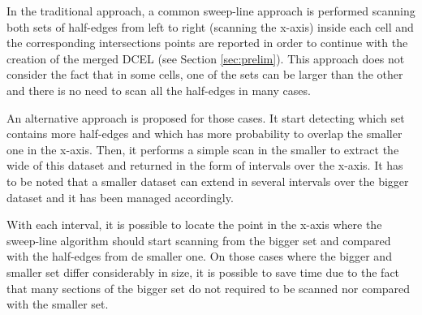 In the traditional approach, a common sweep-line approach is performed scanning both sets of half-edges from left to right (scanning the x-axis) inside each cell and the corresponding intersections points are reported in order to continue with the creation of the merged DCEL (see Section \ref{sec:prelim}). This approach does not consider the fact that in some cells, one of the sets can be larger than the other and there is no need to scan all the half-edges in many cases.

An alternative approach is proposed for those cases.  It start detecting which set contains more half-edges and which has more probability to overlap the smaller one in the x-axis. Then, it performs a simple scan in the smaller to extract the wide of this dataset and returned in the form of intervals over the x-axis.  It has to be noted that a smaller dataset can extend in several intervals over the bigger dataset and it has been managed accordingly.  

With each interval, it is possible to locate the point in the x-axis where the sweep-line algorithm should start scanning from the bigger set and compared with the half-edges from de smaller one. On those cases where the bigger and smaller set differ considerably in size, it is possible to save time due to the fact that many sections of the bigger set do not required to be scanned nor compared with the smaller set.